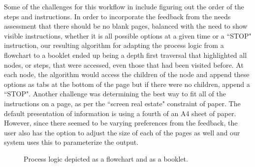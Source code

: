 \documentclass{sig-alternate}
\begin{document}
Some of the challenges for this workflow in \nifty include figuring out the order of the steps and instructions. In order to incorporate the feedback from the needs assessment that there should be no blank pages, balanced with the need to show visible instructions, whether it is all possible options at a given time or a ``STOP" instruction, our resulting algorithm for adapting the process logic from a flowchart to a booklet ended up being a depth first traversal that highlighted all nodes, or steps, that were accessed, even those that had been visited before. At each node, the algorithm would access the children of the node and append these options as tabs at the bottom of the page but if there were no children, append a ``STOP". Another challenge was determining the best way to fit all of the instructions on a page, as per the ``screen real estate" constraint of paper. The default presentation of information is using a fourth of an A4 sheet of paper. However, since there seemed to be varying preferences from the feedback, the user also has the option to adjust the size of each of the pages as well and our system uses this to parameterize the output.

\begin{figure}%
    \centering
    \qquad
    \caption{Process logic depicted as a flowchart and as a booklet.}%
    \label{fig:process}%
\end{figure}
\end{document}

